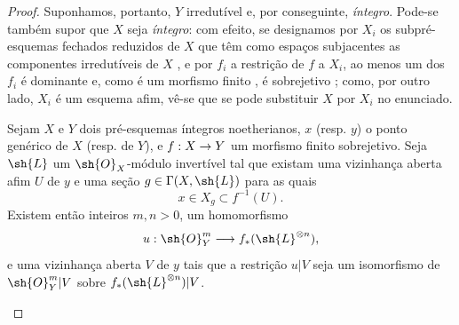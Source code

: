 \documentclass[oneside,10pt]{amsart}
\makeatletter
\newcommand{\ega@arrow}[2]{\mathchoice{#1}{#2}{#2}{#2}}
\renewcommand{\to}{\ega@arrow{\longrightarrow}{\rightarrow}}
\newcommand{\oldpage}[2][]{\marginnote{\normalfont\footnotesize\textbf{#1}~|~#2}\ignorespaces}
\let\EGAOriginalLabel\label
\renewcommand{\label}[1]{\phantomsection\EGAOriginalLabel{#1}}
\makeatother
\begin{document}
\begin{proof}
Suponhamos, portanto, $Y$ irredutível e, por conseguinte, \emph{íntegro}.
Pode-se também supor que $X$ seja \emph{íntegro}:
com efeito, se designamos por $X_i$ os subpré-esquemas fechados reduzidos de $X$ que têm como espaços subjacentes as componentes irredutíveis de $X$ , e por $f_i$ a restrição de $f$ a $X_i$, ao menos um dos $f_i$ é dominante e, como é um morfismo finito , é sobrejetivo ;
como, por outro lado, $X_i$ é um esquema afim, vê-se que se pode substituir $X$ por $X_i$ no enunciado.

\begin{lemma}[6.7.1.1]
\label{II.6.7.1.1}
Sejam $X$ e $Y$ dois pré-esquemas íntegros noetherianos, $x$ (resp. $y$) o ponto genérico de $X$ (resp. de $Y$), e $f:X\to Y$ um morfismo finito sobrejetivo.
Seja $\sh{L}$ um $\sh{O}_X$-módulo invertível tal que existam uma vizinhança aberta afim $U$ de $y$ e uma seção $g\in\Gamma(X,\sh{L})$ para as quais
\oldpage[II]{137}
\[
  x\in X_g\subset f^{-1}(U).
\]
Existem então inteiros $m,n>0$, um homomorfismo
\[
  u:\sh{O}_Y^m\to f_*(\sh{L}^{\otimes n}),
\]
e uma vizinhança aberta $V$ de $y$ tais que a restrição $u|V$ seja um isomorfismo de $\sh{O}_Y^m|V$ sobre $f_*(\sh{L}^{\otimes n})|V$.
\end{lemma}


\end{proof}
\end{document}
